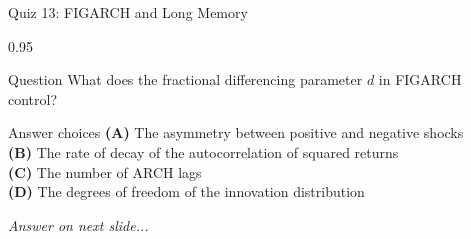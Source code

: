\documentclass[9pt, aspectratio=169, t]{beamer}
\begin{document}
\begin{frame}{Quiz 13: FIGARCH and Long Memory}
    \begin{cminipage}{0.95\textwidth}
    \begin{alertblock}{Question}
        What does the fractional differencing parameter $d$ in FIGARCH control?
    \end{alertblock}

    \vspace{0.4cm}

    \begin{block}{Answer choices}
        \textcolor{MainBlue}{\textbf{(A)}} The asymmetry between positive and negative shocks\\[3pt]
        \textcolor{MainBlue}{\textbf{(B)}} The rate of decay of the autocorrelation of squared returns\\[3pt]
        \textcolor{MainBlue}{\textbf{(C)}} The number of ARCH lags\\[3pt]
        \textcolor{MainBlue}{\textbf{(D)}} The degrees of freedom of the innovation distribution
    \end{block}

    \vspace{0.5cm}

    \begin{center}
        \textit{Answer on next slide...}
    \end{center}
    \end{cminipage}
\end{frame}
\end{document}
